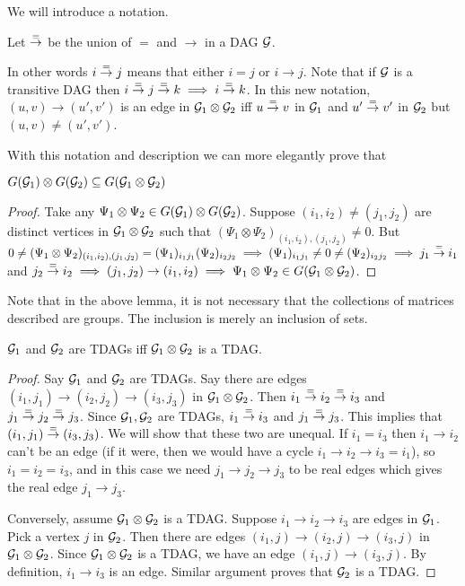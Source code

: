 We will introduce a notation. 
\begin{defn}\label{eto}
Let $\stackrel{=}{\to}$ be the union of $=$ and $\to$ in a DAG ${\mathcal{G}}$.
\end{defn} In other words $i\stackrel{=}{\to} j$ means that either $i=j$ or $i\to j$. Note that if ${\mathcal{G}}$ is a transitive DAG then $i\stackrel{=}{\to} j\stackrel{=}{\to} k\implies i\stackrel{=}{\to} k$. In this new notation, $(u,v)\to (u',v')$ is an edge in ${\mathcal{G}}_1\otimes{\mathcal{G}}_2$ iff $u \stackrel{=}{\to} v$ in ${\mathcal{G}}_1$ and $u'\stackrel{=}{\to} v'$ in ${\mathcal{G}}_2$ but $(u,v)\neq (u',v')$.

With this notation and description we can more elegantly prove that

\begin{lemma}
$G({\mathcal{G}}_1)\otimes G({\mathcal{G}}_2) \subseteq G({\mathcal{G}}_1\otimes {\mathcal{G}}_2)$
\end{lemma}

\begin{proof}
Take any $\Psi_1\otimes \Psi_2\in G({\mathcal{G}}_1)\otimes G({\mathcal{G}}_2)$. Suppose $(i_1,i_2)\neq (j_1,j_2)$ are distinct vertices in ${\mathcal{G}}_1\otimes {\mathcal{G}}_2$ such that $(\Psi_1\otimes \Psi_2)_{(i_1,i_2),(j_1,j_2)} \neq 0$. But $0\neq (\Psi_1\otimes \Psi_2)_{(i_1,i_2),(j_1,j_2)} = (\Psi_1)_{i_1j_1} (\Psi_2)_{i_2j_2} \implies (\Psi_1)_{i_1j_1} \neq 0 \neq (\Psi_2)_{i_2j_2} \implies j_1\stackrel{=}{\to} i_1$ and $j_2\stackrel{=}{\to} i_2\implies (j_1,j_2) \to (i_1,i_2)\implies \Psi_1\otimes \Psi_2\in G({\mathcal{G}}_1\otimes {\mathcal{G}}_2)$.
\hfill\end{proof}

\begin{rmk}
Note that in the above lemma, it is not necessary that the collections of matrices described are groups. The inclusion is merely an inclusion of sets.
\end{rmk}

\begin{lemma}\label{tensortdag}
${\mathcal{G}}_1$ and ${\mathcal{G}}_2$ are TDAGs iff ${\mathcal{G}}_1\otimes {\mathcal{G}}_2$ is a TDAG.
\end{lemma}

\begin{proof}
Say ${\mathcal{G}}_1$ and ${\mathcal{G}}_2$ are TDAGs. Say there are edges $(i_1,j_1)\to (i_2,j_2)\to (i_3,j_3)$ in ${\mathcal{G}}_1\otimes {\mathcal{G}}_2$. Then $i_1\stackrel{=}{\to} i_2\stackrel{=}{\to} i_3$ and $j_1\stackrel{=}{\to} j_2\stackrel{=}{\to} j_3$. Since ${\mathcal{G}}_1,{\mathcal{G}}_2$ are TDAGs, $i_1\stackrel{=}{\to} i_3$ and $j_1\stackrel{=}{\to} j_3$. This implies that $(i_1,j_1)\stackrel{=}{\to} (i_3,j_3)$. We will show that these two are unequal. If $i_1=i_3$ then $i_1\to i_2$ can't be an edge (if it were, then we would have a cycle $i_1\to i_2\to i_3=i_1$), so $i_1=i_2=i_3$, and in this case we need $j_1\to j_2\to j_3$ to be real edges which gives the real edge $j_1\to j_3$.

Conversely, assume ${\mathcal{G}}_1\otimes {\mathcal{G}}_2$ is a TDAG. Suppose $i_1\to i_2\to i_3$ are edges in ${\mathcal{G}}_1$. Pick a vertex $j$ in ${\mathcal{G}}_2$. Then there are edges $(i_1,j)\to (i_2,j)\to (i_3,j)$ in ${\mathcal{G}}_1\otimes {\mathcal{G}}_2$. Since ${\mathcal{G}}_1\otimes {\mathcal{G}}_2$ is a TDAG, we have an edge $(i_1,j)\to (i_3,j)$. By definition, $i_1\to i_3$ is an edge. Similar argument proves that ${\mathcal{G}}_2$ is a TDAG.
\hfill\end{proof}

